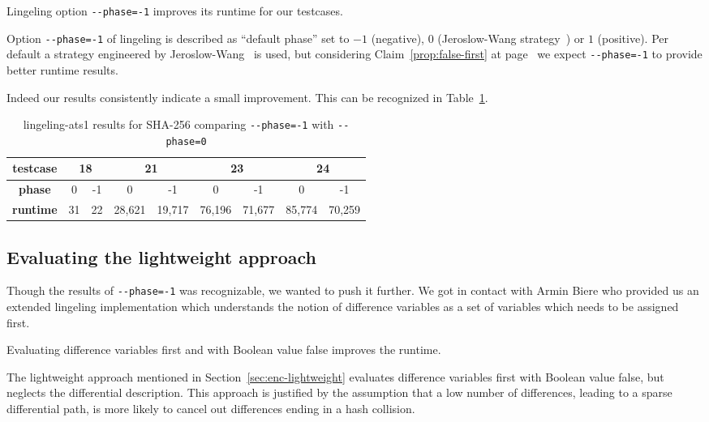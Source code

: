 \newcommand\mone[1][-1]{\texttt{-{}-phase=#1}}
\begin{prop}
  Lingeling option \mone{} improves its runtime for our testcases.
\end{prop}
%
Option \mone{} of lingeling is described as \enquote{default phase} set to
$-1$ (negative), $0$ (Jeroslow-Wang strategy~\cite{JeroslowWang})
or $1$ (positive). Per default a strategy engineered by
Jeroslow-Wang~\cite{JeroslowWang} is used, but considering
Claim~\ref{prop:false-first} at page~\pageref{prop:false-first}
we expect \mone{} to provide better runtime results.

Indeed our results consistently indicate a small improvement.
This can be recognized in Table~\ref{tab:phase-results}.

\begin{table}[!h]
  \begin{center}
    \begin{tabular}{c|cc cc cc cc}
      \textbf{testcase} & \multicolumn{2}{c}{18} & \multicolumn{2}{c}{21} & \multicolumn{2}{c}{23} & \multicolumn{2}{c}{24} \\
    \hline
      \textbf{phase}    &       0 &     -1 &       0 &     -1 &       0 &     -1 &       0 &     -1 \\
    \hline
      \textbf{runtime}  &      31 &     22 &  28,621 & 19,717 &  76,196 & 71,677 & 85,774  & 70,259 \\
    \end{tabular}
    \caption{lingeling-ats1 results for SHA-256 comparing \mone{} with \mone[0]{}}
    \label{tab:phase-results}
  \end{center}
\end{table}

\subsection{Evaluating the lightweight approach}
\label{sec:lightweight-results}
%
Though the results of \mone{} was recognizable, we wanted to push it further.
We got in contact with Armin Biere who provided us an extended lingeling implementation
which understands the notion of difference variables as a set of variables which needs
to be assigned first.

\begin{prop}
  Evaluating difference variables first and with Boolean value false improves the runtime.
\end{prop}
%
The lightweight approach mentioned in Section~\ref{sec:enc-lightweight}
evaluates difference variables first with Boolean value false,
but neglects the differential description.
This approach is justified by the assumption that a low number of differences,
leading to a sparse differential path, is more likely to cancel out differences
ending in a hash collision.


